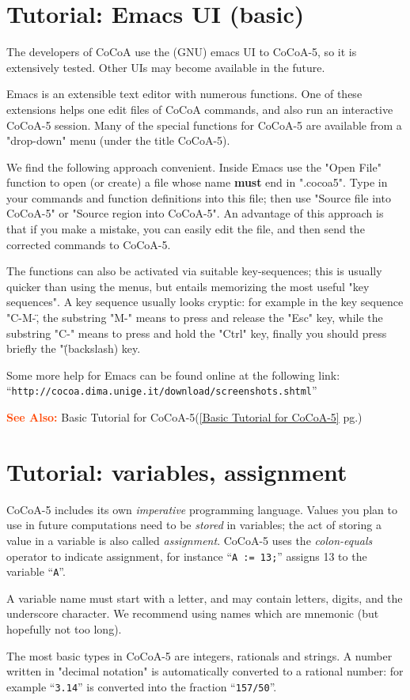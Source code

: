 \documentclass[a4paper]{mybook}
\newcommand\SeeAlso{\par\textcolor{OrangeRed}{\textbf{\large See Also: }}}
\begin{document}
\section{Tutorial: Emacs UI (basic)}
\label{Tutorial: Emacs UI (basic)}

        
The developers of CoCoA use the (GNU) emacs UI to CoCoA-5, so it is
extensively tested.  Other UIs may become available in the future.
\par 
Emacs is an extensible text editor with numerous functions.  One of these
extensions helps one edit files of CoCoA commands, and also run an
interactive CoCoA-5 session.  Many of the special functions for CoCoA-5
are available from a "drop-down" menu (under the title CoCoA-5).
\par 
We find the following approach convenient.  Inside Emacs use the
"Open File" function to open (or create) a file whose name \textbf{must} end
in ".cocoa5".  Type in your commands and function definitions into this
file; then use "Source file into CoCoA-5" or "Source region into CoCoA-5".
An advantage of this approach is that if you make a mistake, you can
easily edit the file, and then send the corrected commands to CoCoA-5.
\par 
The functions can also be activated via suitable key-sequences; this is
usually quicker than using the menus, but entails memorizing the most
useful "key sequences".  A key sequence usually looks cryptic:
for example in the key sequence "C-M-\", the substring "M-" means to
press and release the "Esc" key, while the substring "C-" means to
press and hold the "Ctrl" key, finally you should press briefly the
"\" (backslash) key.
\par 
Some more help for Emacs can be found online at the following link:
``\verb&http://cocoa.dima.unige.it/download/screenshots.shtml&''

\SeeAlso %
  Basic Tutorial for CoCoA-5(\ref{Basic Tutorial for CoCoA-5} pg.\pageref{Basic Tutorial for CoCoA-5})

\section{Tutorial: variables, assignment}
\label{Tutorial: variables, assignment}

        
CoCoA-5 includes its own \textit{imperative} programming language.
Values you plan to use in future computations need to be \textit{stored} in
variables; the act of storing a value in a variable is also called
\textit{assignment}.  CoCoA-5 uses the \textit{colon-equals} operator to indicate
assignment, for instance ``\verb&A := 13;&'' assigns 13 to the variable ``\verb&A&''.
\par 
A variable name must start with a letter, and may contain letters,
digits, and the underscore character.  We recommend using names
which are mnemonic (but hopefully not too long).
\par 
The most basic types in CoCoA-5 are integers, rationals and strings.
A number written in "decimal notation" is automatically converted to
a rational number: for example ``\verb&3.14&'' is converted into the fraction
``\verb&157/50&''.
\end{document}
